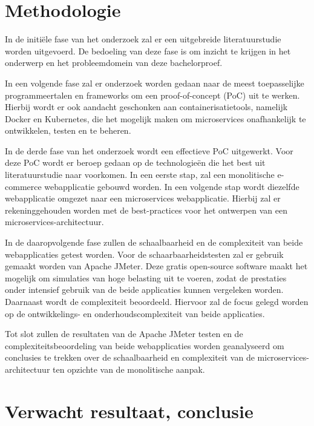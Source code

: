 
\section{Methodologie}%
\label{sec:methodologie}

In de initiële fase van het onderzoek zal er een uitgebreide literatuurstudie worden uitgevoerd. De bedoeling van deze fase is om inzicht te krijgen in het onderwerp en het probleemdomein van deze bachelorproef.

In een volgende fase zal er onderzoek worden gedaan naar de meest toepasselijke programmeertalen en frameworks om een proof-of-concept (PoC) uit te werken. Hierbij wordt er ook aandacht geschonken aan containerisatietools, namelijk Docker en Kubernetes, die het mogelijk maken om microservices onafhankelijk te ontwikkelen, testen en te beheren.

In de derde fase van het onderzoek wordt een effectieve PoC uitgewerkt. Voor deze PoC wordt er beroep gedaan op de technologieën die het best uit literatuurstudie naar voorkomen. In een eerste stap, zal een monolitische e-commerce webapplicatie gebouwd worden. In een volgende stap wordt diezelfde webapplicatie omgezet naar een microservices webapplicatie. Hierbij zal er rekeninggehouden worden met de best-practices voor het ontwerpen van een microservices-architectuur.

In de daaropvolgende fase zullen de schaalbaarheid en de complexiteit van beide webapplicaties getest worden. Voor de schaarbaarheidstesten zal er gebruik gemaakt worden van Apache JMeter. Deze gratis open-source software maakt het mogelijk om simulaties van hoge belasting uit te voeren, zodat de prestaties onder intensief gebruik van de beide applicaties kunnen vergeleken worden. Daarnaast wordt de complexiteit beoordeeld. Hiervoor zal de focus gelegd worden op de ontwikkelings- en onderhoudscomplexiteit van beide applicaties.

Tot slot zullen de resultaten van de Apache JMeter testen en de complexiteitsbeoordeling van beide webapplicaties worden geanalyseerd om conclusies te trekken over de schaalbaarheid en complexiteit van de microservices-architectuur ten opzichte van de monolitische aanpak.

\section{Verwacht resultaat, conclusie}%
\label{sec:verwachte_resultaten}

